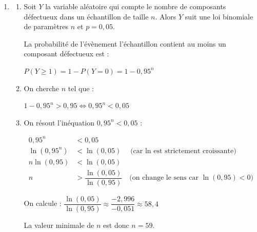 \documentclass[TC, exos, e,p]{phBook}
\begin{document}
\begin{exercice}
\begin{correction}
\begin{enumerate}[resume]
\begin{enumerate}
$P(X \ge 2) = 1 - P(X < 2) = 1 - P(X = 0) - P(X = 1)$

$P(X \ge 2) = 1 - 0,95^{30} - 30 \times 0,05 \times 0,95^{29}$

$P(X \ge 2) \approx 1 - 0,215 - 0,339 \approx 0,446$
	\end{enumerate}

\item
	\begin{enumerate}
		\item Soit $Y$ la variable aléatoire qui compte le nombre de composants défectueux dans un échantillon de taille $n$. Alors $Y$ suit une loi binomiale de paramètres $n$ et $p = 0,05$.

La probabilité de l'évènement \og l'échantillon contient au moins un composant défectueux\fg{} est :

$P(Y \ge 1) = 1 - P(Y = 0) = 1 - 0,95^n$

		\item On cherche $n$ tel que :

$1 - 0,95^n > 0,95 \iff 0,95^n < 0,05$

		\item On résout l'inéquation $0,95^n < 0,05$ :

\begin{align*}
0,95^n &< 0,05 \\
\ln\left(0,95^n\right) &< \ln(0,05) \quad \text{(car $\ln$ est strictement croissante)} \\
n \ln(0,95) &< \ln(0,05) \\
n &> \dfrac{\ln(0,05)}{\ln(0,95)} \quad \text{(on change le sens car $\ln(0,95) < 0$)}
\end{align*}

On calcule : $\dfrac{\ln(0,05)}{\ln(0,95)} \approx \dfrac{-2,996}{-0,051} \approx 58,4$

La valeur minimale de $n$ est donc $\boxed{n = 59}$.
	\end{enumerate}
\end{enumerate}

    \end{correction}
\end{exercice}
\end{document}
